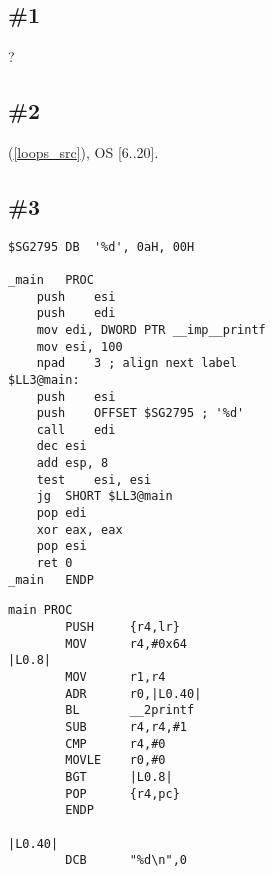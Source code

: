 \section{\Exercises}

\subsection{\Exercise \#1}

 \LOOP {}?

\subsection{\Exercise \#2}

(\ref{loops_src}), 
 \ac{OS}
 [6..20].

\subsection{\Exercise \#3}
\label{exercise_loops_3}

\WhatThisCodeDoes

\begin{lstlisting}[caption=\Optimizing MSVC 2010]
$SG2795	DB	'%d', 0aH, 00H

_main	PROC
	push	esi
	push	edi
	mov	edi, DWORD PTR __imp__printf
	mov	esi, 100
	npad	3 ; align next label
$LL3@main:
	push	esi
	push	OFFSET $SG2795 ; '%d'
	call	edi
	dec	esi
	add	esp, 8
	test	esi, esi
	jg	SHORT $LL3@main
	pop	edi
	xor	eax, eax
	pop	esi
	ret	0
_main	ENDP
\end{lstlisting}

\begin{lstlisting}[caption=\NonOptimizingKeilVI (\ARMMode)]
main PROC
        PUSH     {r4,lr}
        MOV      r4,#0x64
|L0.8|
        MOV      r1,r4
        ADR      r0,|L0.40|
        BL       __2printf
        SUB      r4,r4,#1
        CMP      r4,#0
        MOVLE    r0,#0
        BGT      |L0.8|
        POP      {r4,pc}
        ENDP

|L0.40|
        DCB      "%d\n",0
\end{lstlisting}


